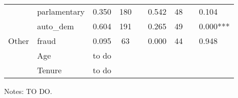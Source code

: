 \begin{table}[h!]
{\begin{threeparttable}
\begin{tabular}{llcclccll}
                                              & parlamentary                                  & 0.350                 & 180                         &                      & 0.542        & 48                 &                      & 0.104                                             \\
                                              & auto\_dem                                      & 0.604                 & 191                        &                      & 0.265        & 49                 &                      & 0.000***                                          \\ \hline
                                              Other & fraud                                         & 0.095                 & 63                          &                      & 0.000        & 44                 &                      & 0.948                                             \\
                                              &Age & to do\\
                                              &Tenure& to do\\ \hline \hline
\end{tabular}
		\begin{tablenotes}
			\footnotesize{Notes: TO DO.}
		\end{tablenotes}
	\end{threeparttable}
}
\end{table}